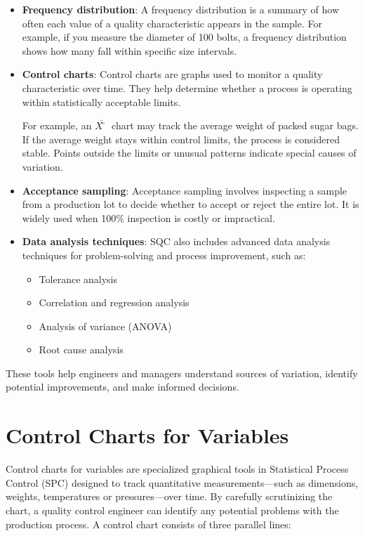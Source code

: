 \documentclass[twoside]{book}
\begin{document}
\begin{itemize}

\item \textbf{Frequency distribution}: A frequency distribution is a summary of how often each value of a quality characteristic appears in the sample. For example, if you measure the diameter of 100 bolts, a frequency distribution shows how many fall within specific size intervals.

\item \textbf{Control charts}: Control charts are graphs used to monitor a quality characteristic over time. They help determine whether a process is operating within statistically acceptable limits.

For example, an $ \overline{X̄} $ chart may track the average weight of packed sugar bags. If the average weight stays within control limits, the process is considered stable. Points outside the limits or unusual patterns indicate special causes of variation.

\item \textbf{Acceptance sampling}: Acceptance sampling involves inspecting a sample from a production lot to decide whether to accept or reject the entire lot. It is widely used when 100\% inspection is costly or impractical.


\item \textbf{Data analysis techniques}: SQC also includes advanced data analysis techniques for problem-solving and process improvement, such as:
\begin{itemize}
    \item {Tolerance analysis}
    \item {Correlation and regression analysis}
    \item {Analysis of variance (ANOVA)}
    \item {Root cause analysis}
\end{itemize}

\end{itemize}

These tools help engineers and managers understand sources of variation, identify potential improvements, and make informed decisions.


\section{Control Charts for Variables}

Control charts for variables are specialized graphical tools in Statistical Process Control (SPC) designed to track quantitative measurements—such as dimensions, weights, temperatures or pressures—over time. By carefully scrutinizing the chart, a
quality control engineer can identify any potential problems with the production process. A control chart consists of three parallel lines:
\end{document}
